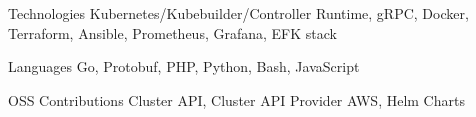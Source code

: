 


\begin{cvskills}


\cvskill
{Technologies} %
{Kubernetes/Kubebuilder/Controller Runtime, gRPC, Docker, Terraform, Ansible, Prometheus, Grafana, EFK stack} %


\cvskill
{Languages} %
{Go, Protobuf, PHP, Python, Bash, JavaScript}


\cvskill
{OSS Contributions} %
{Cluster API, Cluster API Provider AWS, Helm Charts}


\end{cvskills}
